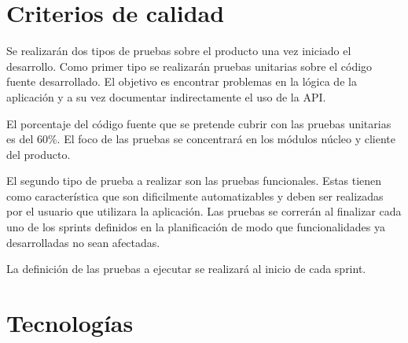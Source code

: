 \documentclass[12pt,a4paper]{article}
\begin{document}
	\section{Criterios de calidad}
	
Se realizarán dos tipos de pruebas sobre el producto una vez iniciado el desarrollo. Como primer tipo se realizarán pruebas unitarias sobre el código fuente desarrollado. El objetivo es encontrar problemas en la lógica de la aplicación y a su vez documentar indirectamente el uso de la API.

	El porcentaje del código fuente que se pretende cubrir con las pruebas unitarias es del 60\%. El foco de las pruebas se concentrará en los módulos núcleo y cliente del producto.

	El segundo tipo de prueba a realizar son las pruebas funcionales. Estas tienen como característica que son dificilmente automatizables y deben ser realizadas por el usuario que utilizara la aplicación. Las pruebas se correrán al finalizar cada uno de los sprints definidos en la planificación de modo que funcionalidades ya desarrolladas no sean afectadas.

La definición de las pruebas a ejecutar se realizará al inicio de cada sprint.	
	
	\section{Tecnologías}
	
\end{document}

